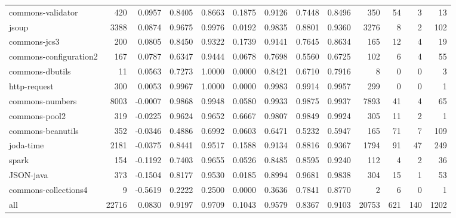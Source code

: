 \begin{table*}
\begin{tabular}{lrrrrrrrrrrrr}
      commons-validator &    420 &      0.0957 &  0.8405 &     0.8663 &     0.1875 &  0.9126 &     0.7448 &   0.8496 &    350 &   54 &    3 &    13 \\
                  jsoup &   3388 &      0.0874 &  0.9675 &     0.9976 &     0.0192 &  0.9835 &     0.8801 &   0.9360 &   3276 &    8 &    2 &   102 \\
           commons-jcs3 &    200 &      0.0805 &  0.8450 &     0.9322 &     0.1739 &  0.9141 &     0.7645 &   0.8634 &    165 &   12 &    4 &    19 \\
 commons-configuration2 &    167 &      0.0787 &  0.6347 &     0.9444 &     0.0678 &  0.7698 &     0.5560 &   0.6725 &    102 &    6 &    4 &    55 \\
        commons-dbutils &     11 &      0.0563 &  0.7273 &     1.0000 &     0.0000 &  0.8421 &     0.6710 &   0.7916 &      8 &    0 &    0 &     3 \\
           http-request &    300 &      0.0053 &  0.9967 &     1.0000 &     0.0000 &  0.9983 &     0.9914 &   0.9957 &    299 &    0 &    0 &     1 \\
        commons-numbers &   8003 &     -0.0007 &  0.9868 &     0.9948 &     0.0580 &  0.9933 &     0.9875 &   0.9937 &   7893 &   41 &    4 &    65 \\
          commons-pool2 &    319 &     -0.0225 &  0.9624 &     0.9652 &     0.6667 &  0.9807 &     0.9849 &   0.9924 &    305 &   11 &    2 &     1 \\
      commons-beanutils &    352 &     -0.0346 &  0.4886 &     0.6992 &     0.0603 &  0.6471 &     0.5232 &   0.5947 &    165 &   71 &    7 &   109 \\
              joda-time &   2181 &     -0.0375 &  0.8441 &     0.9517 &     0.1588 &  0.9134 &     0.8816 &   0.9367 &   1794 &   91 &   47 &   249 \\
                  spark &    154 &     -0.1192 &  0.7403 &     0.9655 &     0.0526 &  0.8485 &     0.8595 &   0.9240 &    112 &    4 &    2 &    36 \\
              JSON-java &    373 &     -0.1504 &  0.8177 &     0.9530 &     0.0185 &  0.8994 &     0.9681 &   0.9838 &    304 &   15 &    1 &    53 \\
   commons-collections4 &      9 &     -0.5619 &  0.2222 &     0.2500 &     0.0000 &  0.3636 &     0.7841 &   0.8770 &      2 &    6 &    0 &     1 \\
                    all &  22716 &      0.0830 &  0.9197 &     0.9709 &     0.1043 &  0.9579 &     0.8367 &   0.9103 &  20753 &  621 &  140 &  1202 \\
\bottomrule
\end{tabular}
\end{table*}
